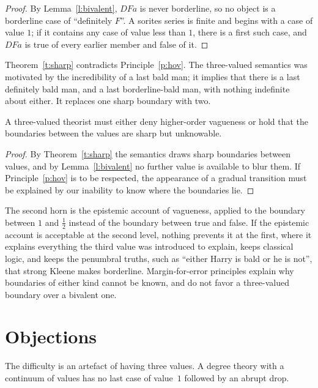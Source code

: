\documentclass{situationist-preprint}
\begin{document}
\begin{proof}
By Lemma~\ref{l:bivalent}, $D F a$ is never borderline, so no object is a borderline case of \enquote{definitely $F$}. A sorites series is finite and begins with a case of value $1$; if it contains any case of value less than $1$, there is a first such case, and $DFa$ is true of every earlier member and false of it.
\end{proof}

Theorem~\ref{t:sharp} contradicts Principle~\ref{p:hov}. The three-valued semantics was motivated by the incredibility of a last bald man; it implies that there is a last definitely bald man, and a last borderline-bald man, with nothing indefinite about either. It replaces one sharp boundary with two.

\begin{corollary}\label{c:dilemma}
A three-valued theorist must either deny higher-order vagueness or hold that the boundaries between the values are sharp but unknowable.
\end{corollary}

\begin{proof}
By Theorem~\ref{t:sharp} the semantics draws sharp boundaries between values, and by Lemma~\ref{l:bivalent} no further value is available to blur them. If Principle~\ref{p:hov} is to be respected, the appearance of a gradual transition must be explained by our inability to know where the boundaries lie.
\end{proof}

The second horn is the epistemic account of vagueness, applied to the boundary between $1$ and $\tfrac12$ instead of the boundary between true and false. If the epistemic account is acceptable at the second level, nothing prevents it at the first, where it explains everything the third value was introduced to explain, keeps classical logic, and keeps the penumbral truths, such as \enquote{either Harry is bald or he is not}, that strong Kleene makes borderline. Margin-for-error principles \citep{Williamson1994} explain why boundaries of either kind cannot be known, and do not favor a three-valued boundary over a bivalent one.

\section{Objections}

\begin{objection}
The difficulty is an artefact of having three values. A degree theory with a continuum of values has no last case of value~$1$ followed by an abrupt drop.
\end{objection}
\end{document}

